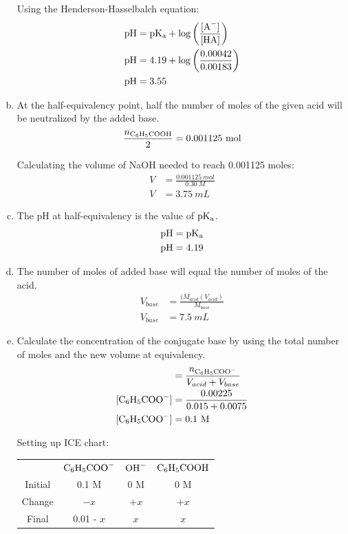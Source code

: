 \documentclass{article}
\begin{document}
\begin{enumerate}[(a)]
        Using the Henderson-Hasselbalch equation:
        \begin{align*}
            \rm{pH} &= \rm{pK_a} + \log \left( \frac{[\ce{A-}]}{[\ce{HA}]}
            \right) \\
            \rm{pH} &= 4.19 + \log \left( \frac{0.00042}{0.00183} \right) \\
            \rm{pH} &= 3.55
        \end{align*}

    \item At the half-equivalency point, half the number of moles of the given
        acid will be neutralized by the added base.
        $$\frac{n_{\ce{C_6H_5COOH}}}{2} = 0.001125\ \si{mol}$$

        Calculating the volume of NaOH needed to reach 0.001125 moles:
        \begin{align*}
            V &= \frac{0.001125\ \si{mol}}{0.30\ \si{M}} \\
            V &= 3.75\ \si{mL}
        \end{align*}

    \item The pH at half-equivalency is the value of $\rm{pK_a}$.
        \begin{align*}
            \rm{pH} &= \rm{pK_a} \\
            \rm{pH} &= 4.19
        \end{align*}

    \item The number of moles of added base will equal the number of moles of
        the acid.
        \begin{align*}
            V_{base} &= \frac{(M_{acid}(V_{acid})}{M_{base}} \\
            V_{base} &= 7.5\ \si{mL}
        \end{align*}

    \item Calculate the concentration of the conjugate base by using the total
        number of moles and the new volume at equivalency.
        \begin{align*}
            [\ce{C_6H_5COO-}] &= \frac{n_{\ce{C_6H5COO-}}}{V_{acid} + V_{base}}
            \\
            [\ce{C_6H_5COO-}] &= \frac{0.00225}{0.015 + 0.0075} \\
            [\ce{C_6H_5COO-}] &= 0.1\ \si{M}
        \end{align*}

        Setting up ICE chart:
        \begin{center}
            \begin{tabular}{c c c c}
                & $\ce{C_6H_5COO-}$ & $\ce{OH-}$ & $\ce{C_6H_5COOH}$ \\
                Initial & 0.1 M & 0 M  & 0 M \\
                Change & $-x$ & $+x$ & $+x$ \\
                Final & 0.01 - $x$ & $x$ & $x$
            \end{tabular}
        \end{center}


\end{enumerate}
\end{document}
